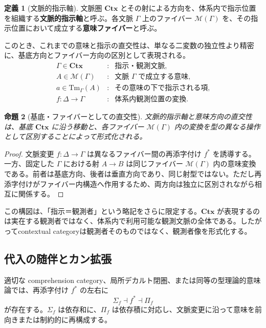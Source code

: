 \documentclass[a4paper,11pt]{ltjsarticle}
\theoremstyle{definition}
\newtheorem{definition}{定義}[section]
\theoremstyle{plain}
\newtheorem{proposition}[definition]{命題}
\newcommand{\Obj}{\mathcal M}
\newcommand{\Ctx}{\mathbf{Ctx}}
\newcommand{\Tm}{\mathrm{Tm}}
\begin{document}
\begin{definition}[文脈的指示軸]
文脈圏 $\Ctx$ とその射による方向を、体系内で指示位置を組織する\textbf{文脈的指示軸}と呼ぶ。各文脈 $\Gamma$ 上のファイバー $\Obj(\Gamma)$ を、その指示位置において成立する\textbf{意味ファイバー}と呼ぶ。
\end{definition}

このとき、これまでの意味と指示の直交性は、単なる二変数の独立性より精密に、基底方向とファイバー方向の区別として表現される。
\begin{equation}
 \begin{array}{ccl}
 \Gamma\in\Ctx
 &:& \text{指示・観測文脈},\\
 A\in\Obj(\Gamma)
 &:& \text{文脈 $\Gamma$ で成立する意味},\\
 a\in\Tm_{\Gamma}(A)
 &:& \text{その意味の下で指示される項},\\
 f:\Delta\to\Gamma
 &:& \text{体系内観測位置の変換}.
 \end{array}
 \label{eq:context-f0-correspondence}
\end{equation}

\begin{proposition}[基底・ファイバーとしての直交性]
文脈的指示軸と意味方向の直交性は、基底 $\Ctx$ に沿う移動と、各ファイバー $\Obj(\Gamma)$ 内の変換を型の異なる操作として区別することによって形式化される。
\end{proposition}

\begin{proof}
文脈変更 $f:\Delta\to\Gamma$ は異なるファイバー間の再添字付け $f^*$ を誘導する。一方、固定した $\Gamma$ における射 $A\to B$ は同じファイバー $\Obj(\Gamma)$ 内の意味変換である。前者は基底方向、後者は垂直方向であり、同じ射型ではない。ただし再添字付けがファイバー内構造へ作用するため、両方向は独立に区別されながら相互に関係する。
\end{proof}

この構図は、「指示＝観測者」という略記をさらに限定する。$\Ctx$ が表現するのは実在する観測者ではなく、体系内で利用可能な観測文脈の全体である。したがってcontextual categoryは観測者そのものではなく、観測者像を形式化する。

\subsection{代入の随伴とカン拡張}

適切な comprehension category、局所デカルト閉圏、または同等の型理論的意味論では、再添字付け $f^*$ の左右に
\begin{equation}
 \Sigma_f\dashv f^*\dashv\Pi_f
 \label{eq:dependent-adjunctions}
\end{equation}
が存在する。$\Sigma_f$ は依存和に、$\Pi_f$ は依存積に対応し、文脈変更に沿って意味を前向きまたは制約的に再構成する。
\end{document}
